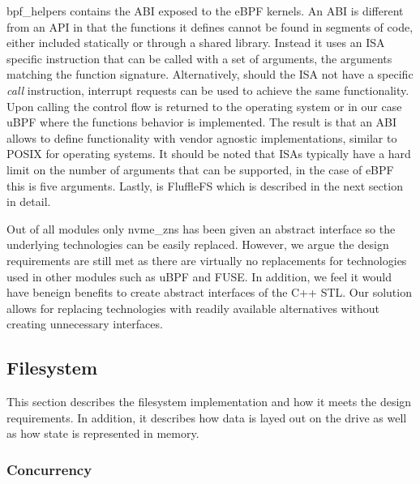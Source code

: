 bpf\_helpers contains the ABI exposed to the eBPF kernels. An ABI is different
from an API in that the functions it defines cannot be found in segments of
code, either included statically or through a shared library. Instead it uses
an ISA specific instruction that can be called with a set of arguments, the
arguments matching the function signature. Alternatively, should the ISA not
have a specific \textit{call} instruction, interrupt requests can be used to
achieve the same functionality. Upon calling the control flow is returned to
the operating system or in our case uBPF where the functions behavior is
implemented. The result is that an ABI allows to define functionality with
vendor agnostic implementations, similar to POSIX for operating systems. It
should be noted that ISAs typically have a hard limit on the number of arguments
that can be supported, in the case of eBPF this is five arguments. Lastly, is
FluffleFS which is described in the next section in detail.

Out of all modules only nvme\_zns has been given an abstract interface so the
underlying technologies can be easily replaced. However, we argue the design
requirements are still met as there are virtually no replacements for
technologies used in other modules such as uBPF and FUSE\footnotemark[10].
In addition, we feel it would have beneign benefits to create abstract
interfaces of the C++ STL. Our solution allows for replacing technologies with
readily available alternatives without creating unnecessary interfaces.


\subsection{Filesystem}

This section describes the filesystem implementation and how it meets the design
requirements. In addition, it describes how data is layed out on the drive as
well as how state is represented in memory.


\subsubsection{Concurrency}

